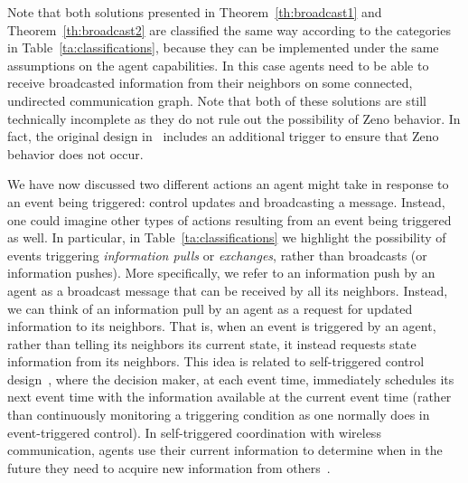 \documentclass{autart}
\newcommand{\NN}{{\mathcal{N}}}
\renewcommand{\hat}{\widehat}
\newcommand{\changes}[1]{{\color{blue} #1}}
\renewcommand{\changes}[1]{#1}
\begin{document}

Note that both solutions presented in Theorem~\ref{th:broadcast1} and
Theorem~\ref{th:broadcast2} are classified the same way according to
the categories in Table~\ref{ta:classifications}, because they can be
implemented under the same assumptions on the agent capabilities. In
this case agents need to be able to receive broadcasted information
from their neighbors on some connected, undirected communication
graph. \changes{Note that both of these solutions are still
  technically incomplete as they do not rule out the possibility of
  Zeno behavior. In fact, the original design in~\cite{CN-JC:16-auto}
  includes an additional trigger to ensure that Zeno behavior does not
  occur.}

We have now discussed two different actions an agent might take in
response to an event being triggered: control updates and broadcasting
a message. Instead, one could imagine other types of actions resulting
from an event being triggered as well. In particular, in
Table~\ref{ta:classifications} we highlight the possibility of events
triggering \emph{information pulls} or \emph{exchanges}, rather than
broadcasts (or information pushes).  More specifically, we refer to an
information push by an agent as a broadcast message that can be
received by all its neighbors. Instead, we can think of an information
pull by an agent as a request for updated information to its
neighbors. That is, when an event is triggered by an agent, rather
than telling its neighbors its current state, it instead requests
state information from its neighbors.  {This idea is related to
self-triggered control design~\citep{AA-PT:10,WPMHH-KHJ-PT:12}, where
the decision maker, at each event time, immediately schedules its next
event time with the information available at the current event time
(rather than continuously monitoring a triggering condition as one
normally does in event-triggered control). In self-triggered
coordination with wireless communication, agents use their current
information to determine when in the future they need to acquire new
information from
others~\citep{CN-JC:11-auto,CDP-PF:13,YF-LL-GF-YW:15,EH-DEQ-EGWP-HS-KHJ:15}.}
\end{document}
